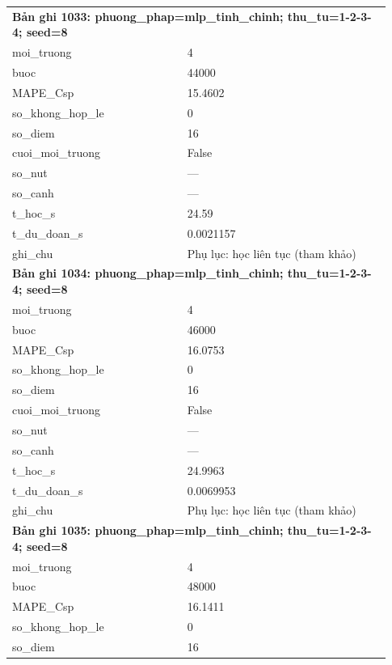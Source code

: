 \begin{longtable}{p{0.43\linewidth}p{0.50\linewidth}}
\midrule
\multicolumn{2}{p{0.95\linewidth}}{\textbf{Bản ghi 1033: phuong\_phap=mlp\_tinh\_chinh; thu\_tu=1-2-3-4; seed=8}} \\
moi\_\allowbreak truong & 4 \\
buoc & 44000 \\
MAPE\_\allowbreak Csp & 15.4602 \\
so\_\allowbreak khong\_\allowbreak hop\_\allowbreak le & 0 \\
so\_\allowbreak diem & 16 \\
cuoi\_\allowbreak moi\_\allowbreak truong & False \\
so\_\allowbreak nut & — \\
so\_\allowbreak canh & — \\
t\_\allowbreak hoc\_\allowbreak s & 24.59 \\
t\_\allowbreak du\_\allowbreak doan\_\allowbreak s & 0.0021157 \\
ghi\_\allowbreak chu & Phụ lục: học liên tục (tham khảo) \\
\midrule
\multicolumn{2}{p{0.95\linewidth}}{\textbf{Bản ghi 1034: phuong\_phap=mlp\_tinh\_chinh; thu\_tu=1-2-3-4; seed=8}} \\
moi\_\allowbreak truong & 4 \\
buoc & 46000 \\
MAPE\_\allowbreak Csp & 16.0753 \\
so\_\allowbreak khong\_\allowbreak hop\_\allowbreak le & 0 \\
so\_\allowbreak diem & 16 \\
cuoi\_\allowbreak moi\_\allowbreak truong & False \\
so\_\allowbreak nut & — \\
so\_\allowbreak canh & — \\
t\_\allowbreak hoc\_\allowbreak s & 24.9963 \\
t\_\allowbreak du\_\allowbreak doan\_\allowbreak s & 0.0069953 \\
ghi\_\allowbreak chu & Phụ lục: học liên tục (tham khảo) \\
\midrule
\multicolumn{2}{p{0.95\linewidth}}{\textbf{Bản ghi 1035: phuong\_phap=mlp\_tinh\_chinh; thu\_tu=1-2-3-4; seed=8}} \\
moi\_\allowbreak truong & 4 \\
buoc & 48000 \\
MAPE\_\allowbreak Csp & 16.1411 \\
so\_\allowbreak khong\_\allowbreak hop\_\allowbreak le & 0 \\
so\_\allowbreak diem & 16 \\

\end{longtable}
